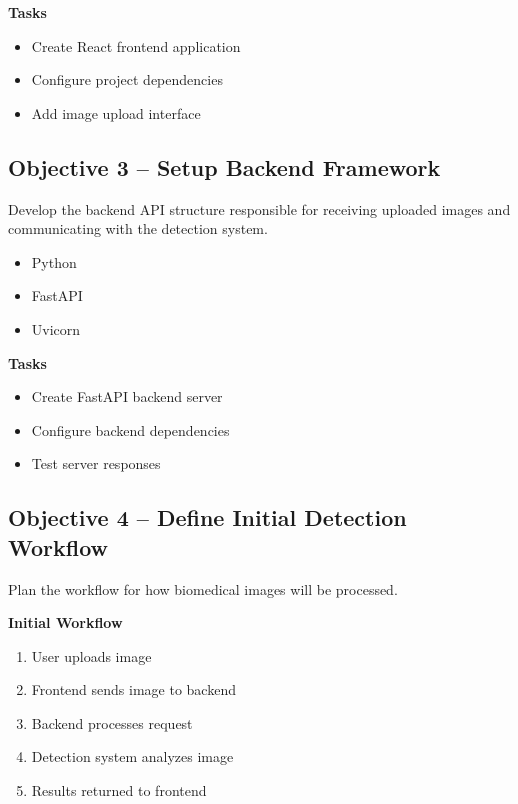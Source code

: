 \documentclass[12pt]{article}
\begin{document}
\textbf{Tasks}

\begin{itemize}
    \item Create React frontend application
    \item Configure project dependencies
    \item Add image upload interface
\end{itemize}

\subsection{Objective 3 -- Setup Backend Framework}

Develop the backend API structure responsible for receiving uploaded images and
communicating with the detection system.

\begin{itemize}
    \item Python
    \item FastAPI
    \item Uvicorn
\end{itemize}

\textbf{Tasks}

\begin{itemize}
    \item Create FastAPI backend server
    \item Configure backend dependencies
    \item Test server responses
\end{itemize}

\subsection{Objective 4 -- Define Initial Detection Workflow}

Plan the workflow for how biomedical images will be processed.

\textbf{Initial Workflow}

\begin{enumerate}
    \item User uploads image
    \item Frontend sends image to backend
    \item Backend processes request
    \item Detection system analyzes image
    \item Results returned to frontend
\end{enumerate}
\end{document}
